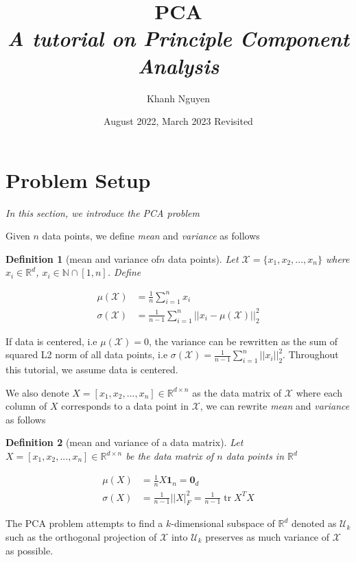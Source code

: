 \documentclass{article}
\title{
    \large PCA \\
    \small \emph{A tutorial on Principle Component Analysis}
}
\author{Khanh Nguyen}
\date{August 2022, March 2023 Revisited}
\DeclareMathOperator{\tr}{tr}
\newtheorem{definition}{Definition}
\begin{document}
\maketitle

\section{Problem Setup}

\emph{In this section, we introduce the PCA problem}

Given $n$ data points, we define \emph{mean} and \emph{variance} as follows

\begin{definition}[mean and variance of$n$ data points]
Let $\mathcal{X} = \{ x_1, x_2, ..., x_n\}$ where $x_i \in \mathbb{R}^d$, $x_i \in \mathbb{N} \cap [1, n]$. Define

\begin{align*} 
\mu(\mathcal{X}) &=  \frac{1}{n} \sum_{i=1}^n x_i \\
\sigma(\mathcal{X}) &=  \frac{1}{n-1} \sum_{i=1}^n || x_i - \mu(\mathcal{X}) ||_2^2
\end{align*}

\end{definition}

If data is centered, i.e $\mu(\mathcal{X}) = 0$, the variance can be rewritten as the sum of squared L2 norm of all data points, i.e $\sigma(\mathcal{X}) = \frac{1}{n-1} \sum_{i=1}^n || x_i ||_2^2$. Throughout this tutorial, we assume data is centered.

We also denote $X = [x_1, x_2, ..., x_n] \in \mathbb{R}^{d \times n}$ as the data matrix of $\mathcal{X}$ where each column of $X$ corresponds to a data point in $\mathcal{X}$, we can rewrite \emph{mean} and \emph{variance} as follows

\begin{definition}[mean and variance of a data matrix]
Let $X = [x_1, x_2, ..., x_n] \in \mathbb{R}^{d \times n}$ be the data matrix of $n$ data points in $\mathbb{R}^d$

\begin{align*} 
\mu(X)      &=  \frac{1}{n} X \mathbf{1}_n = \mathbf{0}_d \\
\sigma(X)   &=  \frac{1}{n-1} ||X|_F^2 = \frac{1}{n-1} \tr X^T X
\end{align*}

\end{definition}

The PCA problem attempts to find a $k$-dimensional subspace of $\mathbb{R}^d$ denoted as $\mathcal{U}_k$ such as the orthogonal projection of $\mathcal{X}$ into $\mathcal{U}_k$ preserves as much variance of $\mathcal{X}$ as possible.
\end{document}
